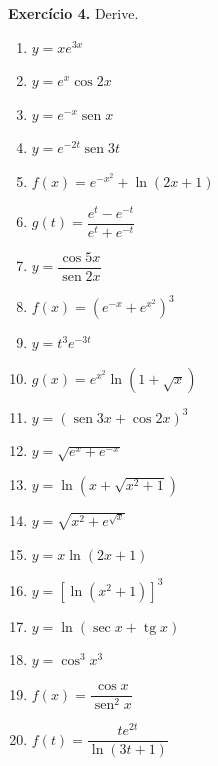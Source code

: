 \documentclass[12pt,a4paper]{article}
\begin{document}
\vspace{0.5cm}
\noindent\textbf{Exercício 4.} Derive.
\begin{enumerate}
    \renewcommand{\theenumi}{\alph{enumi}}
    \renewcommand{\labelenumi}{\theenumi)}
    \item $y = xe^{3x}$
    \item $y = e^x \cos 2x$
    \item $y = e^{-x}\operatorname{sen} x$
    \item $y = e^{-2t}\operatorname{sen} 3t$
    \item $f(x) = e^{-x^2} + \ln(2x + 1)$
    \item $g(t) = \dfrac{e^t - e^{-t}}{e^t + e^{-t}}$
    \item $y = \dfrac{\cos 5x}{\operatorname{sen} 2x}$
    \item $f(x) = (e^{-x} + e^{x^2})^3$
    \item $y = t^3 e^{-3t}$
    \item $g(x) = e^{x^2}\ln(1 + \sqrt{x})$
    \item $y = (\operatorname{sen} 3x + \cos 2x)^3$
    \item $y = \sqrt{e^x + e^{-x}}$
    \item $y = \ln(x + \sqrt{x^2 + 1})$
    \item $y = \sqrt{x^2 + e^{\sqrt{x}}}$
    \item $y = x\ln(2x + 1)$
    \item $y = [\ln(x^2 + 1)]^3$
    \item $y = \ln(\sec x + \operatorname{tg} x)$
    \item $y = \cos^3 x^3$
    \item $f(x) = \dfrac{\cos x}{\operatorname{sen}^2 x}$
    \item $f(t) = \dfrac{te^{2t}}{\ln(3t + 1)}$
\end{enumerate}
\end{document}
